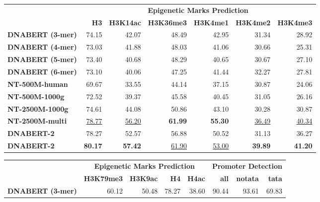 \documentclass{article}
\begin{document}
\begin{table}[H]
	\centering
	\footnotesize
	\begin{tabular}{lrrrrrr}
		\toprule
        	& \multicolumn{6}{c}{\textbf{Epigenetic Marks Prediction}} \\
		\cmidrule(lr){2-7}
		& \textbf{ H3 } & \textbf{ H3K14ac } & \textbf{ H3K36me3 } & \textbf{ H3K4me1 } & \textbf{ H3K4me2 } & \textbf{ H3K4me3 } \\
		\midrule
		{\textbf{DNABERT (3-mer)} } & 74.15 & 42.07 & 48.49 & 42.95 & 31.34 & 28.92 \\
		
		{\textbf{DNABERT (4-mer)} } & 73.03 & 41.88 & 48.03 & 41.06 & 30.66 & 25.31 \\

            {\textbf{DNABERT (5-mer)} } & 73.40 & 40.68 & 48.29 & 40.65 & 30.67 & 27.10  \\

            {\textbf{DNABERT (6-mer) } } &  73.10 & 40.06 & 47.25 & 41.44 & 32.27 & 27.81  \\
            
            {\textbf{NT-500M-human} } & 69.67 & 33.55 & 44.14 & 37.15 & 30.87 & 24.06 \\

            {\textbf{NT-500M-1000g} } & 72.52 & 39.37 & 45.58 & 40.45 & 31.05 & 26.16 \\

            {\textbf{NT-2500M-1000g} } & 74.61 & 44.08 & 50.86 & 43.10 & 30.28 & 30.87 \\

            {\textbf{NT-2500M-multi} } & \underline{78.77} & \underline{56.20} & \textbf{61.99} & \textbf{55.30} & \underline{36.49} & \underline{40.34} \\

		
		\midrule

            {\textbf{DNABERT-2} } & 78.27 & 52.57 & 56.88 & 50.52 & 31.13 & 36.27 \\

            {\textbf{DNABERT-2} } &  \textbf{80.17} & \textbf{57.42} & \underline{61.90} & \underline{53.00} & \textbf{39.89} & \textbf{41.20}  \\
		\bottomrule
	\end{tabular}

	\begin{tabular}{lrrrrrrr}
		\toprule
  & \multicolumn{4}{c}{\textbf{Epigenetic Marks Prediction}} & \multicolumn{3}{c}{\textbf{Promoter Detection}} \\
		\cmidrule(lr){2-5}  \cmidrule(lr){6-8}
		& \textbf{ H3K79me3 } & \textbf{ H3K9ac } & \textbf{ H4 } & \textbf{ H4ac } & \textbf{all} & \textbf{notata} & \textbf{tata} \\
		\midrule
		{\textbf{DNABERT (3-mer)} } &  60.12 & 50.48 & 78.27 & 38.60 &90.44 & 93.61 & 69.83 \\
		

\end{tabular}
\end{table}
\end{document}

